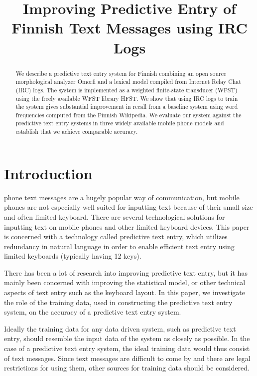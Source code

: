 \documentclass[a4paper,conference]{IEEEtran}
\title{Improving Predictive Entry of Finnish Text Messages using IRC Logs}
\author{
\IEEEauthorblockA{\ldots\\
\ldots\\
\ldots\\
\ldots}
\and
\IEEEauthorblockA{\ldots\\
\ldots\\
\ldots\\
\ldots}
\and
\IEEEauthorblockA{\ldots\\
\ldots\\
\ldots\\
\ldots}
}
\begin{document}
\maketitle


\begin{abstract}
We describe a predictive text entry system for Finnish combining an
open source morphological analyzer Omorfi and a lexical model compiled
from Internet Relay Chat (IRC) logs. The system is implemented as a
weighted finite-state transducer (WFST) using the freely available
WFST library HFST. We show that using IRC logs to train the system
gives substantial improvement in recall from a baseline system using
word frequencies computed from the Finnish Wikipedia. We evaluate our
system against the predictive text entry systems in three widely
available mobile phone models and establish that we achieve comparable
accuracy.
\end{abstract}

\section{Introduction}
\label{sec:introduction}

 phone text messages are a hugely popular way
of communication, but mobile phones are not especially well suited for
inputting text because of their small size and often limited
keyboard. There are several technological solutions for inputting text
on mobile phones and other limited keyboard devices. This paper is
concerned with a technology called predictive text entry, which utilizes
redundancy in natural language in order to enable efficient text entry
using limited keyboards (typically having 12 keys).

There has been a lot of research into improving predictive text entry,
but it has mainly been concerned with improving the statistical model,
or other technical aspects of text entry such as the keyboard
layout. In this paper, we investigate the role of the training data,
used in constructing the predictive text entry system, on the accuracy
of a predictive text entry system.

Ideally the training data for any data driven system, such as
predictive text entry, should resemble the input data of the system as
closely as possible. In the case of a predictive text entry system,
the ideal training data would thus consist of text messages. Since
text messages are difficult to come by and there are legal
restrictions for using them, other sources for training data should be
considered.
\end{document}
